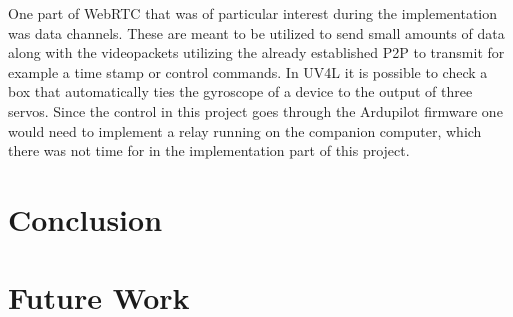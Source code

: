 \documentclass[nofilelist]{cslthse-msc}
\begin{document}
One part of WebRTC that was of particular interest during the implementation was data channels. These are meant to be utilized to send small amounts of data along with the videopackets utilizing the already established P2P to transmit for example a time stamp or control commands. In UV4L it is possible to check a box that automatically ties the gyroscope of a device to the output of three servos. Since the control in this project goes through the Ardupilot firmware one would need to implement a relay running on the companion computer, which there was not time for in the implementation part of this project. 

\chapter{Conclusion}

\chapter{Future Work}


{}
\end{document}
